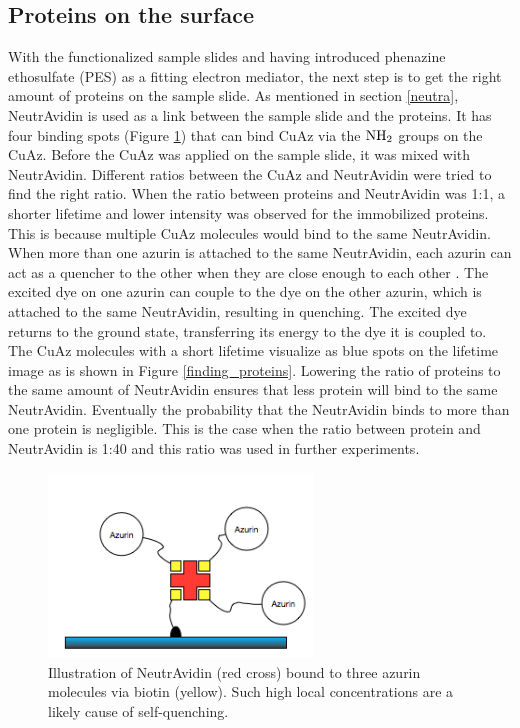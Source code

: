 \documentclass[twoside,single]{lion-msc}
\begin{document}
\subsection{Proteins on the surface}
With the functionalized sample slides and having introduced phenazine ethosulfate (PES) as a fitting electron mediator, the next step is to get the right amount of proteins on the sample slide. As mentioned in section \ref{neutra},  NeutrAvidin is used as a link between the sample slide and the proteins. It has four binding spots  (Figure \ref{avidinratio}) that can bind CuAz via the $\textup{NH}_{2}$ groups on the CuAz.  Before the CuAz was applied on the sample slide, it was mixed with NeutrAvidin. Different ratios between the CuAz and NeutrAvidin were tried to find the right ratio. When the ratio between proteins and NeutrAvidin was 1:1, a shorter lifetime and lower intensity was observed for the immobilized proteins. This is because multiple CuAz molecules would bind to the same NeutrAvidin. When more than one azurin is attached to the same NeutrAvidin, each azurin can act as a quencher to the other when they are close enough to each other \cite{Lakowicz2006}. The excited dye on one azurin can couple to the dye on the other azurin, which is attached to the same NeutrAvidin, resulting in quenching. The excited dye returns to the ground state, transferring its energy to the dye it is coupled to. The CuAz molecules with a short lifetime visualize as blue spots on the lifetime image as is shown in Figure \ref{finding_proteins}. Lowering the ratio of proteins to the same amount of NeutrAvidin ensures that less protein will bind to the same NeutrAvidin. Eventually the probability that the NeutrAvidin binds to more than one protein is negligible. This is the case when the ratio between protein and NeutrAvidin is 1:40 and this ratio was used in further experiments.

\begin{figure}[ht!]
\centering
\includegraphics[width=70mm]{ratio_avadin}
\caption{Illustration of NeutrAvidin (red cross) bound to three azurin molecules via biotin (yellow). Such high local concentrations are a likely cause of self-quenching.}
\label{avidinratio}
\end{figure}
\end{document}
